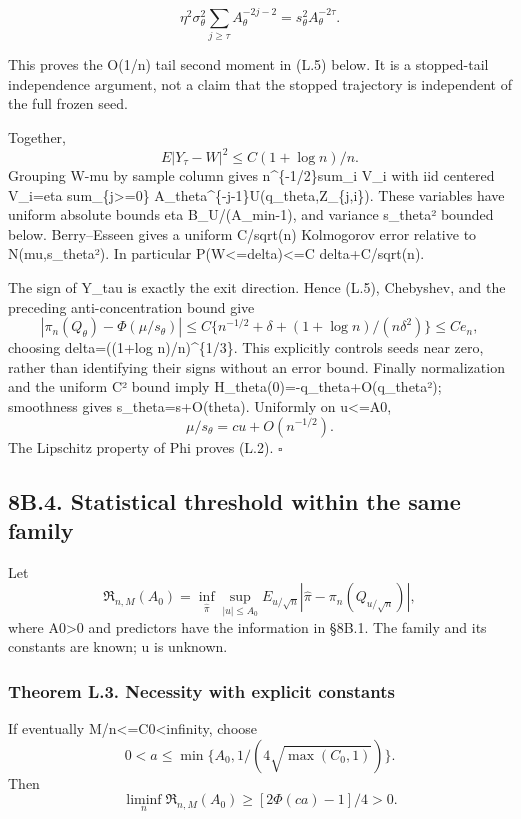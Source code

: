 \[
\eta^2\sigma_\theta^2\sum_{j\ge\tau}A_\theta^{-2j-2}
=s_\theta^2 A_\theta^{-2\tau}.
\]

This proves the O(1/n) tail second moment in (L.5) below. It is a
stopped-tail independence argument, not a claim that the stopped
trajectory is independent of the full frozen seed.

Together, \[
E|Y_\tau-W|^2\le C(1+\log n)/n.
\tag{L.5}
\] Grouping W-mu by sample column gives n\^{}\{-1/2\}sum\_i V\_i with
iid centered V\_i=eta sum\_\{j\textgreater=0\}
A\_theta\^{}\{-j-1\}U(q\_theta,Z\_\{j,i\}). These variables have uniform
absolute bounds eta B\_U/(A\_min-1), and variance s\_theta² bounded
below. Berry--Esseen gives a uniform C/sqrt(n) Kolmogorov error relative
to N(mu,s\_theta²). In particular
P(\textbar W\textbar\textless=delta)\textless=C delta+C/sqrt(n).

The sign of Y\_tau is exactly the exit direction. Hence (L.5),
Chebyshev, and the preceding anti-concentration bound give \[
|\pi_n(Q_\theta)-\Phi(\mu/s_\theta)|
\le C\{n^{-1/2}+\delta+(1+\log n)/(n\delta^2)\}\le C e_n,
\] choosing delta=((1+log n)/n)\^{}\{1/3\}. This explicitly controls
seeds near zero, rather than identifying their signs without an error
bound. Finally normalization and the uniform C² bound imply
H\_theta(0)=-q\_theta+O(q\_theta²); smoothness gives
s\_theta=s+O(\textbar theta\textbar). Uniformly on
\textbar u\textbar\textless=A0, \[
\mu/s_\theta=cu+O(n^{-1/2}).
\] The Lipschitz property of Phi proves (L.2). \(\square\)

\subsection{8B.4. Statistical threshold within the same
family}\label{local_prediction-b.4.-statistical-threshold-within-the-same-family}

Let \[
\mathfrak R_{n,M}(A_0)=\inf_{\widehat\pi}
\sup_{|u|\le A_0}E_{u/\sqrt n}
|\widehat\pi-\pi_n(Q_{u/\sqrt n})|,
\] where A0\textgreater0 and predictors have the information in §8B.1.
The family and its constants are known; u is unknown.

\subsubsection{Theorem L.3. Necessity with explicit
constants}\label{local_prediction-theorem-l.3.-necessity-with-explicit-constants}

If eventually M/n\textless=C0\textless infinity, choose \[
0<a\le\min\{A_0,1/(4\sqrt{\max(C_0,1)})\}.
\] Then \[
\liminf_n\mathfrak R_{n,M}(A_0)\ge [2\Phi(ca)-1]/4>0.
\tag{L.6}
\]

